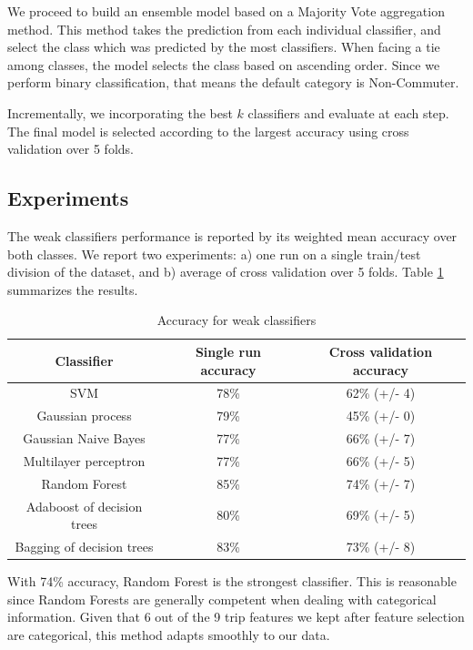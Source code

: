\documentclass{article}
\begin{document}
We proceed to build an ensemble model based on a Majority Vote aggregation method. This method takes the prediction from each individual classifier, and select the class which was predicted by the most classifiers. When facing a tie among classes, the model selects the class based on ascending order. Since we perform binary classification, that means the default category is Non-Commuter. 

Incrementally, we incorporating the best $k$ classifiers and evaluate at each step. The final model is selected according to the largest accuracy using cross validation over 5 folds. 

\subsection{Experiments}
The weak classifiers performance is reported by its weighted mean accuracy over both classes. We report two experiments: a) one run on a single train/test division of the dataset, and b) average of cross validation over 5 folds. Table \ref{table:weakClassifiers} summarizes the results. 

\begin{table}[H]
\centering
\begin{tabular}{||c|c|c||}
\hline
\textbf{Classifier} & \textbf{Single run accuracy} & \textbf{Cross validation accuracy} \\ [0.5ex] 
\hline \hline
SVM & 78\% & 62\% (+/- 4)\\
Gaussian process & 79\% & 45\% (+/- 0)\\
Gaussian Naive Bayes & 77\% & 66\% (+/- 7)\\
Multilayer perceptron & 77\% & 66\% (+/- 5)\\
Random Forest & 85\% & 74\% (+/- 7)\\
Adaboost of decision trees & 80\% & 69\% (+/- 5)\\
Bagging of decision trees & 83\% & 73\% (+/- 8)\\ [1ex]
\hline 
\end{tabular}
\caption{Accuracy for weak classifiers}
\label{table:weakClassifiers}
\end{table}

With 74\% accuracy, Random Forest is the strongest classifier. This is reasonable since Random Forests are generally competent when dealing with categorical information. Given that 6 out of the 9 trip features we kept after feature selection are categorical, this method adapts smoothly to our data. 
\end{document}
